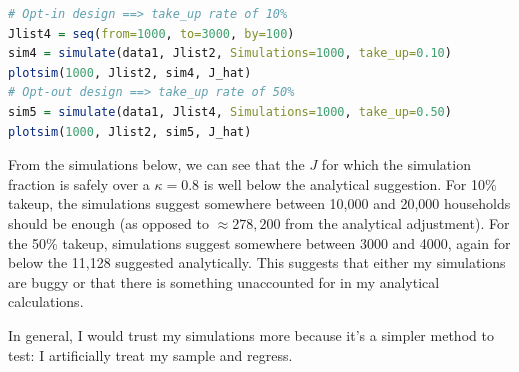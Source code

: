 \documentclass[12pt]{article}
\begin{document}
\begin{lstlisting}[language=R]
# Opt-in design ==> take_up rate of 10%
Jlist4 = seq(from=1000, to=3000, by=100)
sim4 = simulate(data1, Jlist2, Simulations=1000, take_up=0.10)
plotsim(1000, Jlist2, sim4, J_hat)
# Opt-out design ==> take_up rate of 50%
sim5 = simulate(data1, Jlist4, Simulations=1000, take_up=0.50)
plotsim(1000, Jlist2, sim5, J_hat)
\end{lstlisting}

From the simulations below, we can see that the $J$ for which the simulation fraction is safely over a $\kappa=0.8$ is well below the analytical suggestion. For 10\% takeup, the simulations suggest somewhere between 10,000 and 20,000 households should be enough (as opposed to $\approx 278,200 $ from the analytical adjustment). For the 50\% takeup, simulations suggest somewhere between 3000 and 4000, again for below the 11,128 suggested analytically. This suggests that either my simulations are buggy or that there is something unaccounted for in my analytical calculations. 

In general, I would trust my simulations more because it's a simpler method to test: I artificially treat my sample and regress.
\end{document}
